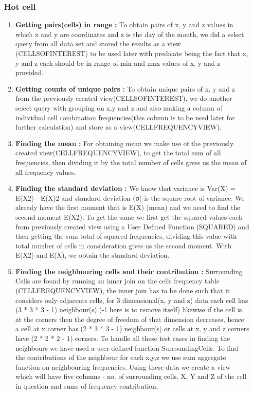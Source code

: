 \subsubsection{Hot cell}

\begin{enumerate}
    \item \textbf{Getting pairs(cells) in range :} To obtain pairs of x, y and z values in which x and y are coordinates and z is the day of the month, we did a select query from all data set and stored the results as a view (CELLSOFINTEREST) to be used later  with predicate being the fact that x, y and z each should be in range of min and max values of x, y and z provided.
    \item \textbf{Getting counts of unique pairs :} To obtain unique pairs of x, y and z from the previously created view(CELLSOFINTEREST), we do another select query with grouping on x,y and z and also making a column of individual cell combination frequencies(this column is to be used later for further calculation) and store as a view(CELLFREQUENCYVIEW).
    \item \textbf{Finding the mean :} For obtaining mean we make use of the previously created view(CELLFREQUENCYVIEW), to get the total sum of all frequencies, then dividing it by the total number of cells gives us the mean of all frequency values.
    \item \textbf{Finding the standard deviation :} We know that variance is  Var(X) = E(X2) - E(X)2 and standard deviation (σ) is the square root of variance. We already have the first moment that is E(X) (mean) and we need to find the second moment E(X2). To get the same we first get the squared values each from previously created view using a User Defined Function (SQUARED) and then getting the sum total of squared frequencies, dividing this value with total number of cells in consideration gives us the second moment. With E(X2) and E(X), we obtain the standard deviation.
    \item \textbf{Finding the neighbouring cells and their contribution :} Surrounding Cells are found by running an inner join on the cells frequency table (CELLFREQUENCYVIEW), the inner join has to be done such that it considers only adjacents cells, for 3 dimensional(x, y and z) data each cell has (3 * 3 * 3 - 1) neighbour(s) (-1 here is to remove itself)  likewise if the cell is at the corners then the degree of freedom of that dimension decreases, hence a cell at x corner has (2 * 3 * 3 - 1) neighbour(s) or cells at x, y and z corners have (2 * 2 * 2 - 1) corners. To handle all these test cases in finding the neighbours we have used a user-defined function SurroundingCells. To find the contributions of the neighbour for each x,y,z we use sum aggregate function on neighbouring frequencies. Using these data we create a view which will have five columns -  no. of surrounding cells, X, Y and Z of the cell in question and sums of frequency contribution.

\end{enumerate}
